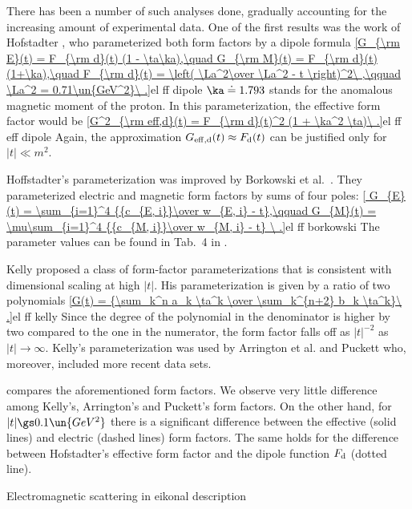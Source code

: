 There has been a number of such analyses done, gradually accounting for the increasing amount of experimental data. One of the first results was the work of Hofstadter , who parameterized both form factors by a dipole formula
\eqref{G_{\rm E}(t) = F_{\rm d}(t) (1 - \ta\ka),\quad G_{\rm M}(t) = F_{\rm d}(t) (1+\ka),\quad F_{\rm d}(t) = \left( \La^2\over \La^2 - t \right)^2\ ,\qquad \La^2 = 0.71\un{GeV^2}\ .}{el ff dipole}
$\ka\doteq 1.793$ stands for the anomalous magnetic moment of the proton. In this parameterization, the effective form factor would be
\eqref{G^2_{\rm eff,d}(t) = F_{\rm d}(t)^2 (1 + \ka^2 \ta)\ .}{el ff eff dipole}
Again, the approximation $G_{\rm eff,d}(t)\approx F_{\rm d}(t)$ can be justified only for $|t| \ll m^2$.

Hoffstadter's parameterization was improved by Borkowski et al.~. They parameterized electric and magnetic form factors by sums of four poles:
\eqref{
G_{E}(t) = \sum_{i=1}^4 {{c_{E, i}}\over w_{E, i} - t},\qquad
G_{M}(t) = \mu\sum_{i=1}^4 {{c_{M, i}}\over w_{M, i} - t}
\ .}{el ff borkowski}
The parameter values can be found in Tab.~4 in .

Kelly  proposed a class of form-factor parameterizations that is consistent with dimensional scaling at high $|t|$. His parameterization is given by a ratio of two polynomials
\eqref{G(t) = {\sum_k^n a_k \ta^k \over \sum_k^{n+2} b_k \ta^k}\ .}{el ff kelly}
Since the degree of the polynomial in the denominator is higher by two compared to the one in the numerator, the form factor falls off as $|t|^{-2}$ as $|t|\to\infty$. Kelly's parameterization was used by Arrington et al.  and Puckett  who, moreover, included more recent data sets.

 compares the aforementioned form factors. We observe very little difference among Kelly's, Arrington's and Puckett's form factors. On the other hand, for $|t| \gs 0.1\un{GeV^2}$ there is a significant difference between the effective (solid lines) and electric (dashed lines) form factors. The same holds for the difference between Hofstadter's effective form factor and the dipole function $F_{\rm d}$ (dotted line).


\caption{Electromagnetic scattering in eikonal description}

